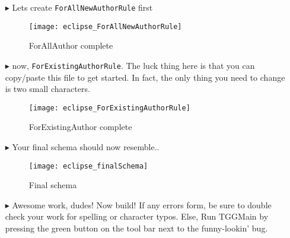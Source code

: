 \begin{itemize}
\item[$\blacktriangleright$] Lets create \texttt{ForAllNewAuthorRule} first

\begin{figure}[htbp]
\begin{center}
  \texttt{[image: eclipse\_ForAllNewAuthorRule]}
  \caption{ForAllAuthor complete}
  \label{eclipse:ForAllNewAuthorRule}
\end{center}
\end{figure}

\item[$\blacktriangleright$] now, \texttt{ForExistingAuthorRule}. The luck thing here is that you can copy/paste this file to get started. In fact, the only
thing you need to change is two small characters.

\begin{figure}[htbp]
\begin{center}
  \texttt{[image: eclipse\_ForExistingAuthorRule]}
  \caption{ForExistingAuthor complete}
  \label{eclipse:ForExistingAuthorRule}
\end{center}
\end{figure}


\item[$\blacktriangleright$] Your final schema should now resemble..

\begin{figure}[htbp]
\begin{center}
  \texttt{[image: eclipse\_finalSchema]}
  \caption{Final schema}
  \label{eclipse:schemaFinal}
\end{center}
\end{figure}

\item[$\blacktriangleright$] Awesome work, dudes! Now build! If any errors form, be sure to double check your work for spelling or character typos. Else, Run
TGGMain by pressing the green button on the tool bar next to the funny-lookin' bug.


\end{itemize}
